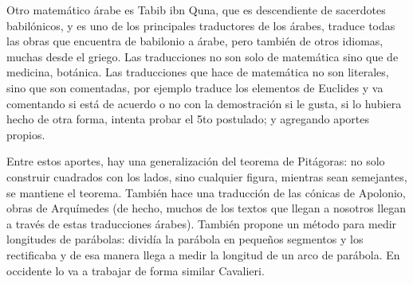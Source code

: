Otro matemático árabe es Tabib ibn Quna, que es descendiente de sacerdotes babilónicos, y es uno de los principales traductores de los árabes, traduce todas las obras que encuentra de babilonio a árabe, pero también de otros idiomas, muchas desde el griego. Las traducciones no son solo de matemática sino que de medicina, botánica. Las traducciones que hace de matemática no son literales, sino que son comentadas, por ejemplo traduce los elementos de Euclides y va comentando si está de acuerdo o no con la demostración si le gusta, si lo hubiera hecho de otra forma, intenta probar el 5to postulado; y agregando aportes propios. 

Entre estos aportes, hay una generalización del teorema de Pitágoras: no solo construir cuadrados con los lados, sino cualquier figura, mientras sean semejantes, se mantiene el teorema. También hace una traducción de las cónicas de Apolonio, obras de Arquímedes (de hecho, muchos de los textos que llegan a nosotros llegan a través de estas traducciones árabes). También propone un método para medir longitudes de parábolas: dividía la parábola en pequeños segmentos y los rectificaba y de esa manera llega a medir la longitud de un arco de parábola. En occidente lo va a trabajar de forma similar Cavalieri.
